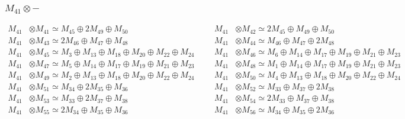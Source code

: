 \subsubsection{$ M_{41}\otimes -$}
\begin{align*}
M_{41} &\otimes M_{41} \simeq M_{45} \oplus 2M_{49} \oplus M_{50} &&& M_{41} &\otimes M_{42} \simeq 2M_{45} \oplus M_{49} \oplus M_{50}\\
M_{41} &\otimes M_{43} \simeq 2M_{46} \oplus M_{47} \oplus M_{48} &&& M_{41} &\otimes M_{44} \simeq M_{46} \oplus M_{47} \oplus 2M_{48}\\
M_{41} &\otimes M_{45} \simeq M_{3} \oplus M_{13} \oplus M_{18} \oplus M_{20} \oplus M_{22} \oplus M_{24} &&& M_{41} &\otimes M_{46} \simeq M_{6} \oplus M_{14} \oplus M_{17} \oplus M_{19} \oplus M_{21} \oplus M_{23}\\
M_{41} &\otimes M_{47} \simeq M_{5} \oplus M_{14} \oplus M_{17} \oplus M_{19} \oplus M_{21} \oplus M_{23} &&& M_{41} &\otimes M_{48} \simeq M_{1} \oplus M_{14} \oplus M_{17} \oplus M_{19} \oplus M_{21} \oplus M_{23}\\
M_{41} &\otimes M_{49} \simeq M_{2} \oplus M_{13} \oplus M_{18} \oplus M_{20} \oplus M_{22} \oplus M_{24} &&& M_{41} &\otimes M_{50} \simeq M_{4} \oplus M_{13} \oplus M_{18} \oplus M_{20} \oplus M_{22} \oplus M_{24}\\
M_{41} &\otimes M_{51} \simeq M_{34} \oplus 2M_{35} \oplus M_{36} &&& M_{41} &\otimes M_{52} \simeq M_{33} \oplus M_{37} \oplus 2M_{38}\\
M_{41} &\otimes M_{53} \simeq M_{33} \oplus 2M_{37} \oplus M_{38} &&& M_{41} &\otimes M_{54} \simeq 2M_{33} \oplus M_{37} \oplus M_{38}\\
M_{41} &\otimes M_{55} \simeq 2M_{34} \oplus M_{35} \oplus M_{36} &&& M_{41} &\otimes M_{56} \simeq M_{34} \oplus M_{35} \oplus 2M_{36}\\
\end{align*}

